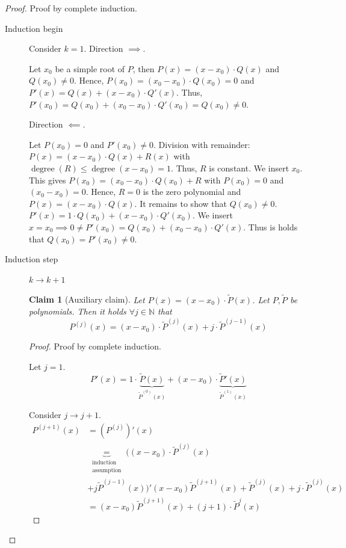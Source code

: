 \documentclass{article}
\newtheorem*{claim}{Claim}%
\begin{document}
\begin{proof}
  Proof by complete induction.

  \begin{description}
    \item[Induction begin]
      Consider $k=1$. Direction $\implies$.

      Let $x_0$ be a simple root of $P$, then $P(x) = (x - x_0) \cdot Q(x)$ and $Q(x_0) \neq 0$.
      Hence, $P(x_0) = (x_0 - x_0) \cdot Q(x_0) = 0$ and $P'(x) = Q(x) + (x - x_0) \cdot Q'(x)$.
      Thus, $P'(x_0) = Q(x_0) + (x_0 - x_0) \cdot Q'(x_0) = Q(x_0) \neq 0$.

      Direction $\impliedby$.

      Let $P(x_0) = 0$ and $P'(x_0) \neq 0$. Division with remainder: $P(x) = (x - x_0) \cdot Q(x) + R(x)$
      with $\operatorname{degree}(R) \leq \operatorname{degree}(x - x_0) = 1$. Thus, $R$ is constant.
      We insert $x_0$. This gives $P(x_0) = (x_0 - x_0) \cdot Q(x_0) + R$ with $P(x_0) = 0$ and $(x_0 - x_0) = 0$.
      Hence, $R = 0$ is the zero polynomial and $P(x) = (x - x_0) \cdot Q(x)$.
      It remains to show that $Q(x_0) \neq 0$. $P'(x) = 1\cdot Q(x_0) + (x - x_0) \cdot Q'(x_0)$.
      We insert $x = x_0 \implies 0 \neq P'(x_0) = Q(x_0) + (x_0 - x_0) \cdot Q'(x)$.
      Thus is holds that $Q(x_0) = P'(x_0) \neq 0$.
    \item[Induction step] $k \to k+1$ \hfill{}
      \begin{claim}[Auxiliary claim]
        Let $P(x) = (x - x_0) \cdot \tilde P(x)$.
        Let $P, \tilde P$ be polynomials. Then it holds $\forall j \in \mathbb N$ that
        \[ P^{(j)}(x) = (x - x_0) \cdot \tilde P^{(j)}(x) + j \cdot \tilde P^{(j-1)}(x) \]
      \end{claim}
      \begin{proof}
        Proof by complete induction.

        Let $j = 1$.
        \[ P'(x) = 1 \cdot \underbrace{\tilde P(x)}_{\tilde P^{(0)}(x)} + (x - x_0) \cdot \underbrace{\tilde P'(x)}_{\tilde P^{(1)}(x)} \]

        Consider $j \to j + 1$.
        \begin{align*}
          P^{(j+1)}(x) &= \left(P^{(j)}\right)'(x) \\
          &\underbrace{=}_{\substack{\text{induction} \\ \text{assumption}}} ((x - x_0) \cdot \tilde P^{(j)}(x) \\
          &+ j \tilde P^{(j-1)}(x))' (x - x_0) \tilde P^{(j+1)}(x) + \tilde P^{(j)}(x) + j \cdot \tilde P^{(j)}(x) \\
          &= (x - x_0) \tilde P^{(j+1)}(x) + (j + 1) \cdot \tilde P^{j}(x)
        \end{align*}
      \end{proof}


\end{description}
\end{proof}
\end{document}
